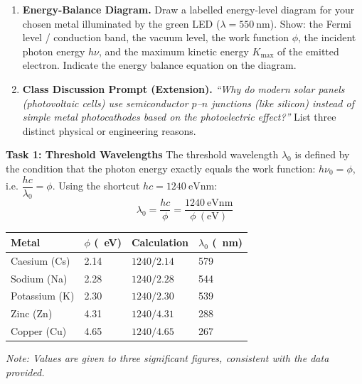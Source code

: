 \documentclass[11pt]{article}
\newcounter{popsec}
\newcounter{popsub}
\newcommand{\courssub}[1]{%
  \stepcounter{popsub}%
  \par\vspace{9pt}\noindent{\popxbold\fontsize{11.5}{13}\selectfont\color{popink}{\color{poporange}\thepopsec.\thepopsub}\hspace{6pt}#1}\par\nopagebreak\vspace{4pt}
}
\begin{document}
\begin{enumerate}
    Write a short justification (approx. 100 words).
    \item \textbf{Energy-Balance Diagram.} Draw a labelled energy-level diagram for your chosen metal illuminated by the green LED ($\lambda = \SI{550}{\nano\meter}$). Show: the Fermi level / conduction band, the vacuum level, the work function $\phi$, the incident photon energy $h\nu$, and the maximum kinetic energy $K_{\text{max}}$ of the emitted electron. Indicate the energy balance equation on the diagram.
    \item \textbf{Class Discussion Prompt (Extension).} \emph{``Why do modern solar panels (photovoltaic cells) use semiconductor $p$--$n$ junctions (like silicon) instead of simple metal photocathodes based on the photoelectric effect?''} List three distinct physical or engineering reasons.
\end{enumerate}

\courssub{Model Solutions}

\textbf{Task 1: Threshold Wavelengths}
The threshold wavelength $\lambda_0$ is defined by the condition that the photon energy exactly equals the work function: $h\nu_0 = \phi$, i.e. $\dfrac{hc}{\lambda_0} = \phi$. Using the shortcut $hc = \SI{1240}{\electronvolt\nano\meter}$:
\[
\lambda_0 = \frac{hc}{\phi} = \frac{\SI{1240}{\electronvolt\nano\meter}}{\phi\ (\mathrm{eV})}
\]

\begin{center}
\begin{tabularx}{\linewidth}{|l|X|X|X|}\hline
\rowcolor{popblueL}
\textbf{Metal} & \textbf{$\phi$ (\SI{}{\electronvolt})} & \textbf{Calculation} & \textbf{$\lambda_0$ (\SI{}{\nano\meter})} \\ \hline
Caesium (Cs) & 2.14 & $1240 / 2.14$ & 579 \\ \hline
Sodium (Na) & 2.28 & $1240 / 2.28$ & 544 \\ \hline
Potassium (K) & 2.30 & $1240 / 2.30$ & 539 \\ \hline
Zinc (Zn) & 4.31 & $1240 / 4.31$ & 288 \\ \hline
Copper (Cu) & 4.65 & $1240 / 4.65$ & 267 \\ \hline
\end{tabularx}
\end{center}
\textit{Note: Values are given to three significant figures, consistent with the data provided.}
\end{document}
